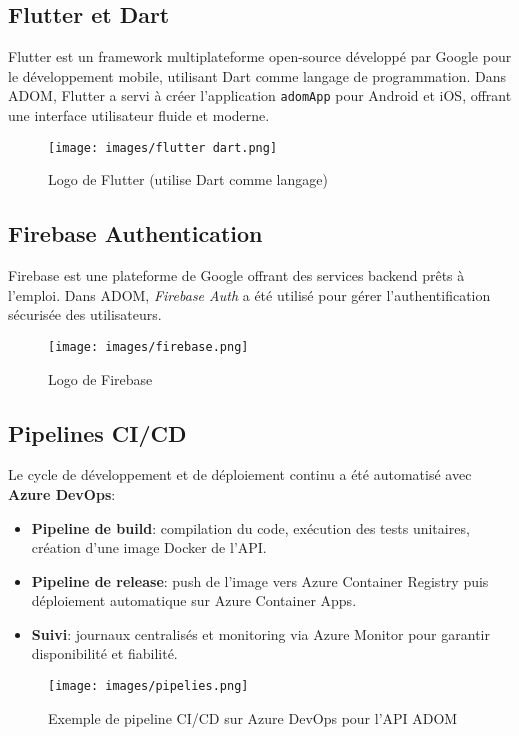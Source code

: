 \documentclass[12pt,a4paper]{report}
\begin{document}
\subsection{Flutter et Dart}
Flutter est un framework multiplateforme open-source développé par Google pour le
développement mobile, utilisant Dart comme langage de programmation.
Dans ADOM, Flutter a servi à créer l’application \texttt{adomApp} pour Android et iOS, offrant
une interface utilisateur fluide et moderne.
\begin{figure}[H]
    \centering
    \texttt{[image: images/flutter dart.png]}
    \caption{Logo de Flutter (utilise Dart comme langage)}
\end{figure}

\subsection{Firebase Authentication}
Firebase est une plateforme de Google offrant des services backend prêts à l’emploi.
Dans ADOM, \textit{Firebase Auth} a été utilisé pour gérer l’authentification sécurisée des utilisateurs.
\begin{figure}[H]
    \centering
    \texttt{[image: images/firebase.png]}
    \caption{Logo de Firebase}
\end{figure}
\cleardoublepage
\subsection{Pipelines CI/CD}
Le cycle de développement et de déploiement continu a été automatisé avec \textbf{Azure DevOps}:
\begin{itemize}
    \item \textbf{Pipeline de build}: compilation du code, exécution des tests unitaires, création d’une image Docker de l’API.
    \item \textbf{Pipeline de release}: push de l’image vers Azure Container Registry puis déploiement automatique sur Azure Container Apps.
    \item \textbf{Suivi}: journaux centralisés et monitoring via Azure Monitor pour garantir disponibilité et fiabilité.
\end{itemize}

\begin{figure}[H]
    \centering
    \texttt{[image: images/pipelies.png]}
    \caption{Exemple de pipeline CI/CD sur Azure DevOps pour l’API ADOM}
\end{figure}
\end{document}
